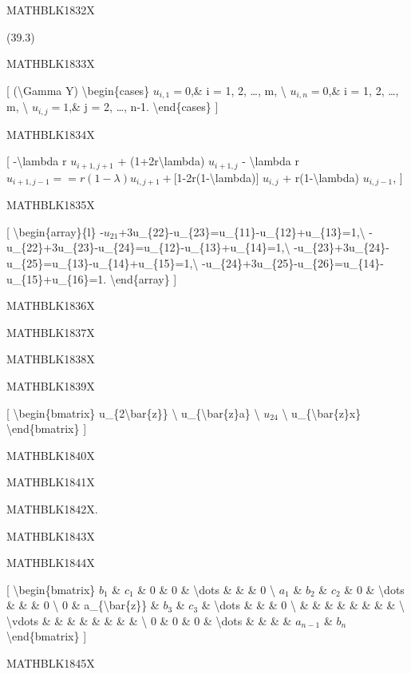\documentclass[
]{article}
\begin{document}
{{{MATHBLK1832X

(39.3)

MATHBLK1833X

{[} (\textbackslash Gamma Y) \textbackslash begin\{cases\}
\(u_{i, 1} = 0\),\& i = 1, 2, \ldots, m, \textbackslash{}
\(u_{i, n} = 0\),\& i = 1, 2, \ldots, m, \textbackslash{}
\(u_{i, j} = 1\),\& j = 2, \ldots, n-1. \textbackslash end\{cases\} {]}

MATHBLK1834X

{[} -\textbackslash lambda r \(u_{i+1, j+1}\) +
(1+2r\textbackslash lambda) \(u_{i+1, j}\) - \textbackslash lambda r
\(u_{i+1, j-1} = = r(1-\lambda) u_{i, j+1} +\){[}1-2r(1-\textbackslash lambda){]}
\(u_{i, j}\) + r(1-\textbackslash lambda) \(u_{i, j-1}\), {]}

MATHBLK1835X

{[} \textbackslash begin\{array\}\{l\}
-\(u_{21}\)+3u\_\{22\}-u\_\{23\}=u\_\{11\}-u\_\{12\}+u\_\{13\}=1,\textbackslash{}
-u\_\{22\}+3u\_\{23\}-u\_\{24\}=u\_\{12\}-u\_\{13\}+u\_\{14\}=1,\textbackslash{}
-u\_\{23\}+3u\_\{24\}-u\_\{25\}=u\_\{13\}-u\_\{14\}+u\_\{15\}=1,\textbackslash{}
-u\_\{24\}+3u\_\{25\}-u\_\{26\}=u\_\{14\}-u\_\{15\}+u\_\{16\}=1.
\textbackslash end\{array\} {]}

MATHBLK1836X

MATHBLK1837X

MATHBLK1838X

MATHBLK1839X

{[} \textbackslash begin\{bmatrix\} u\_\{2\textbackslash bar\{z\}\}
\textbackslash{} u\_\{\textbackslash bar\{z\}a\} \textbackslash{}
\(u_{24}\) \textbackslash{} u\_\{\textbackslash bar\{z\}x\}
\textbackslash end\{bmatrix\} {]}

MATHBLK1840X

MATHBLK1841X

MATHBLK1842X.

MATHBLK1843X

MATHBLK1844X

{[} \textbackslash begin\{bmatrix\} \(b_1\) \& \(c_1\) \& 0 \& 0 \&
\textbackslash dots \& \& \& 0 \textbackslash{} \(a_1\) \& \(b_2\) \&
\(c_2\) \& 0 \& \textbackslash dots \& \& \& 0 \textbackslash{} 0 \&
a\_\{\textbackslash bar\{z\}\} \& \(b_3\) \& \(c_3\) \&
\textbackslash dots \& \& \& 0 \textbackslash{} \& \& \& \& \& \& \& \&
\textbackslash{} \textbackslash vdots \& \& \& \& \& \& \& \&
\textbackslash{} 0 \& 0 \& 0 \& \textbackslash dots \& \& \& \&
\(a_{n-1}\) \& \(b_n\) \textbackslash end\{bmatrix\} {]}

MATHBLK1845X

}}}
\end{document}
